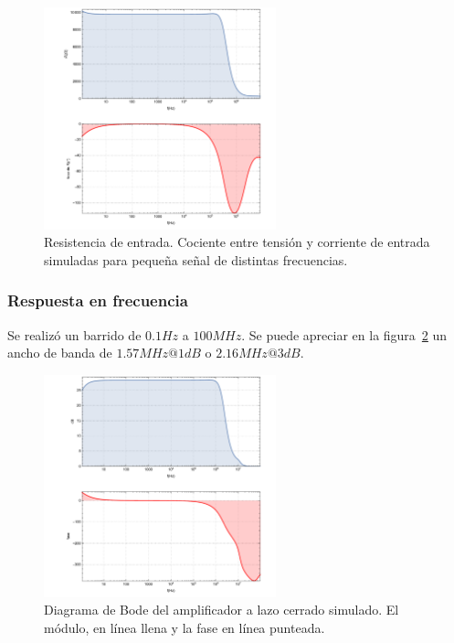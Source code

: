 \documentclass[a4paper,12pt,twoside]{article}
\begin{document}
\begin{figure}[H]
	\centering
	\includegraphics[width=0.6\textwidth]{img/sim/R_i}
	\caption{Resistencia de entrada. Cociente entre tensión y corriente de entrada simuladas para pequeña señal de distintas frecuencias.}
	\label{fig:R_i}
\end{figure}



\subsubsection{Respuesta en frecuencia} 

Se realizó un barrido de $0.1Hz$ a $100MHz$. Se puede apreciar en la figura~\ref{fig:bode} un ancho de banda de $1.57MHz@1dB$ o $2.16MHz@3dB$.

\begin{figure}[H]
	\centering
	\includegraphics[width=0.6\textwidth]{img/sim/bode}
	\caption{Diagrama de Bode del amplificador a lazo cerrado simulado. El módulo, en línea llena y la fase en línea punteada.}
	\label{fig:bode}
\end{figure}
\end{document}
